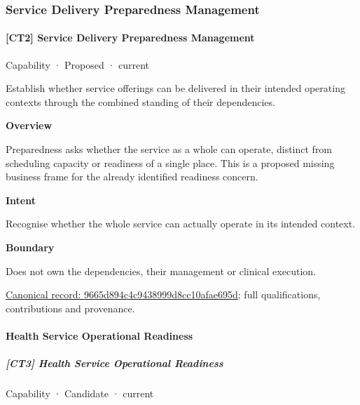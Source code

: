 \subsubsection{Service Delivery Preparedness Management}

\paragraph{[CT2] Service Delivery Preparedness Management}

\label{element:9665d894c4c9438999d8cc10afae695d}
{\small Capability · Proposed · current}\par

Establish whether service offerings can be delivered in their intended operating contexts through the combined standing of their dependencies.



\textbf{Overview}



Preparedness asks whether the service as a whole can operate, distinct from scheduling capacity or readiness of a single place. This is a proposed missing business frame for the already identified readiness concern.



\textbf{Intent}



Recognise whether the whole service can actually operate in its intended context.



\textbf{Boundary}



Does not own the dependencies, their management or clinical execution.


{\footnotesize \href{../../../../continuum/strategy/capability/9665d894c4c9438999d8cc10afae695d.md}{Canonical record: 9665d894c4c9438999d8cc10afae695d}; full qualifications, contributions and provenance.}\par
\paragraph{Health Service Operational Readiness}

\subparagraph{[CT3] Health Service Operational Readiness}

\label{element:cc91eb4017034939ab82b152bddf7b1c}
{\small Capability · Candidate · current}\par

